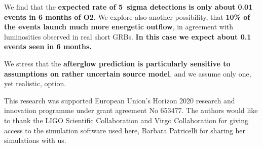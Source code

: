 \documentclass[a0,portrait]{a0poster}
\renewcommand{\emph}[1]{\textbf{\color{blue}#1}}
\begin{document}
\begin{multicols}{2}
We find that the \emph{expected rate of 5~sigma detections is only about
0.01 events in 6 months of O2}. We explore also another
possibility, that \emph{10\% of the events launch much more energetic
outflow}, in agreement with luminosities observed in real short
GRBs. \emph{In this case we expect about 0.1 events seen in 6 months.} 

We stress that the \emph{afterglow prediction is particularly sensitive to
assumptions on rather uncertain source model}, and we assume only
one, yet realistic, option.





\vspace{10mm}

{\linespread{0.1} \footnotesize This research was supported European Union’s Horizon 2020 research and
  innovation programme under grant agreement No 653477. The authors would like
  to thank the LIGO Scientific Collaboration and Virgo Collaboration for giving
  access to the simulation software used here, Barbara Patricelli for sharing
  her simulations with us.}


{\footnotesize
}


\end{multicols}
\end{document}
